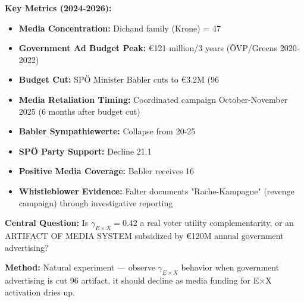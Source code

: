 
\begin{tcolorbox}[colback=blue!5!white, colframe=blue!75!black,
    title=Quick Reference: Austrian Media Political Economy]

\textbf{Key Metrics (2024-2026):}
\begin{itemize}
\item \textbf{Media Concentration:} Dichand family (Krone) = 47%
\item \textbf{Government Ad Budget Peak:} €121 million/3 years (ÖVP/Greens 2020-2022)
\item \textbf{Budget Cut:} SPÖ Minister Babler cuts to €3.2M (96%
\item \textbf{Media Retaliation Timing:} Coordinated campaign October-November 2025 (6 months after budget cut)
\item \textbf{Babler Sympathiewerte:} Collapse from 20-25%
\item \textbf{SPÖ Party Support:} Decline 21.1%
\item \textbf{Positive Media Coverage:} Babler receives 16%
\item \textbf{Whistleblower Evidence:} Falter documents "Rache-Kampagne" (revenge campaign) through investigative reporting
\end{itemize}

\textbf{Central Question:}
Is $\gamma_{E \times X} = 0.42$ a real voter utility complementarity, or an
ARTIFACT OF MEDIA SYSTEM subsidized by €120M annual government advertising?

\textbf{Method:} Natural experiment — observe $\gamma_{E \times X}$ behavior when
government advertising is cut 96%
artifact, it should decline as media funding for E×X activation dries up.

\end{tcolorbox}


